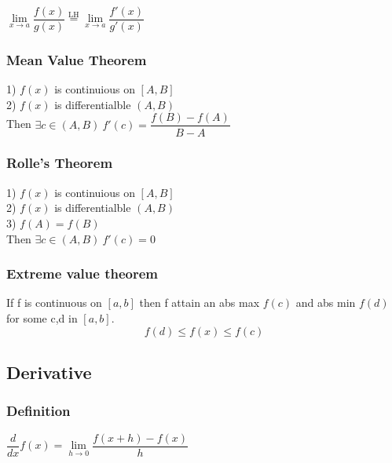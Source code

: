 \documentclass[5pt]{article}
\begin{document}
\begin{multicols}{3}
\begin{center}
$\lim\limits_{x\to a}\dfrac{f(x)}{g(x)}\stackrel{\text{LH}}{=}\lim\limits_{x\to a}\dfrac{f'(x)}{g'(x)}$    
\end{center}






\subsubsection{Mean Value Theorem}
1) $f(x)$ is continuious on $[A,B]$\\
2) $f(x)$ is differentialble $(A,B)$\\
Then $\exists c\in (A,B)\: f'(c)=\dfrac{f(B)-f(A)}{B-A}$
\subsubsection{Rolle's Theorem}
1) $f(x)$ is continuious on $[A,B]$\\
2) $f(x)$ is differentialble $(A,B)$\\
3) $f(A)=f(B)$\\
Then $\exists c\in (A,B)\: f'(c)=0$

\subsubsection{Extreme value theorem}
If f is continuous on $[a,b]$ then f attain an abs max $f(c)$ and abs  min $f(d)$ for some c,d in $[a,b]$.
\begin{equation}
    f(d)\leq f(x)\leq f(c)
\end{equation}


\subsection{Derivative}
\subsubsection{Definition}
$\dfrac{d}{dx}f(x) = \lim\limits_{h\to0}\dfrac{f(x+h)-f(x)}{h}$

\end{multicols}
\end{document}
